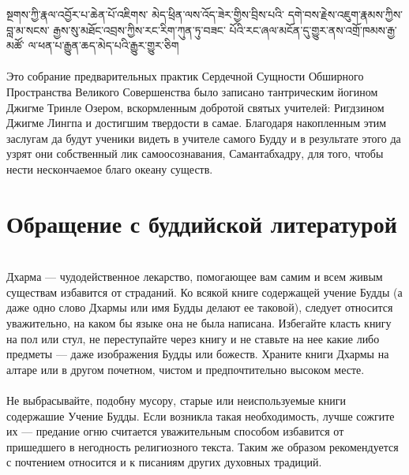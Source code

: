 སྔགས་ཀྱི་རྣལ་འབྱོར་པ་ཆེན་པོ་འཇིགས་
མེད་ཕྲིན་ལས་འོད་ཟེར་གྱིས་བྲིས་པའི་
དགེ་བས་རྗེས་འཇུག་རྣམས་ཀྱིས་བླ་མ་སངས་
རྒྱས་སུ་མཐོང་འབྲས་ཀྱིས་རང་རིག་ཀུན་ཏུ་བཟང་
པོའི་རང་ཞལ་མངོན་དུ་གྱུར་ནས་འགྲོ་ཁམས་རྒྱ་མཚོ་
ལ་ཕན་པ་རྒྱུན་ཆད་མེད་པའི་རྒྱུར་གྱུར་ཅིག\\
\\
\ru\scriptsize\noindent
Это собрание предварительных практик Сердечной Сущности
Об\-ширного Пространства Великого Совершенства было записано
тантри\-ческим йогином Джигме Тринле Озером,
вскормленным добротой святых учителей: Ригдзином Джигме Лингпа
и достигшим твердости в самае. Благодаря накопленным
этим заслугам да будут ученики видеть в учителе самого Будду
и в результате этого да узрят они собственный лик
самоосознавания, Самантабхадру, для того, чтобы нести
нескончаемое благо океану существ.
\normalsize
\newpage
\section*{Обращение с буддийской литературой}
\\
Дхарма — чудодейственное лекарство, помогающее вам
самим и всем живым существам избавится от страданий.
Ко всякой книге содержащей учение Будды (а даже одно
слово Дхармы или имя Будды делают ее таковой),  следует
относится уважи\-тельно, на каком бы языке она не была написана.
Избегайте класть книгу на пол или стул, не переступайте
через книгу и не ставьте на нее какие либо
предметы — даже изображения Будды или божеств.
Храните книги Дхармы на алтаре или в другом почетном,
чистом и предпочтительно высоком месте.
\paragraph{}
Не выбрасывайте, подобну мусору, старые или неиспользуе\-мые
книги содержашие Учение Будды. Если возникла такая необходимость,
лучше сожгите их — предание огню считается уважительным
способом избавится от пришедшего в негод\-ность 
религиозного текста. Таким же образом рекомендуется
с почтением относится и к писаниям других духовных традиций.
